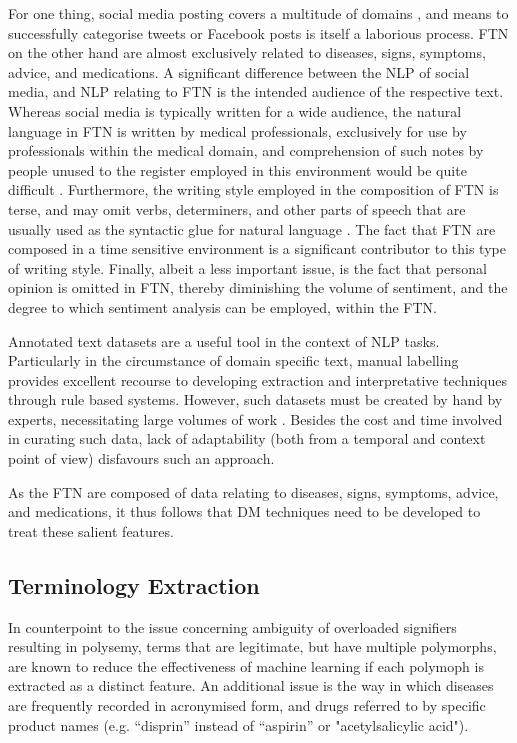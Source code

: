 For one thing, social media posting covers a multitude of domains \cite{deng2017adapting,leiner2018functional}, and means to successfully categorise tweets or Facebook posts is itself a laborious process. FTN on the other hand are almost exclusively related to diseases, signs, symptoms, advice, and medications. A significant difference between the NLP of social media, and NLP relating to FTN is the intended audience of the respective text. Whereas social media is typically written for a wide audience, the natural language in FTN is written by medical professionals, exclusively for use by professionals within the medical domain, and comprehension of such notes by people unused to the register employed in this environment would be quite difficult \cite{friedman2002two}. Furthermore, the writing style employed in the composition of FTN is terse, and may omit verbs, determiners, and other parts of speech that are usually used as the syntactic glue for natural language \cite{bunkenborg2019implementing}. The fact that FTN are composed in a time sensitive environment is a significant contributor to this type of writing style. Finally, albeit a less important issue, is the fact that personal opinion is omitted in FTN, thereby diminishing the volume of sentiment, and the degree to which sentiment analysis can be employed, within the FTN. 

 Annotated text datasets are a useful tool in the context of NLP tasks. Particularly in the circumstance of domain specific text, manual labelling provides excellent recourse to developing extraction and interpretative techniques through rule based systems. However, such datasets must be created by hand by experts, necessitating large volumes of work \cite{dietrich2019replicating}. Besides the cost and time involved in curating such data, lack of adaptability (both from a temporal and context point of view) disfavours such an approach. 



As the FTN are composed of data relating to diseases, signs, symptoms, advice, and medications, it thus follows that DM techniques need to be developed to treat these salient features. 

\subsection{Terminology Extraction}
\label{section-rr-terminology-extraction}

In counterpoint to the issue concerning ambiguity of overloaded signifiers resulting in polysemy, terms that are legitimate, but have multiple polymorphs, are known to reduce the effectiveness of machine learning if each polymoph is extracted as a distinct feature. An additional issue is the way in which diseases are frequently recorded in acronymised form, and drugs referred to by specific product names (e.g. “disprin” instead of “aspirin” or "acetylsalicylic acid"). 

